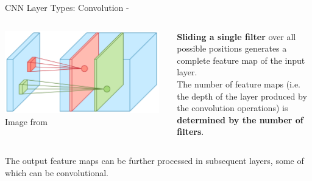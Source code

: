 \begin{frame}[t,allowframebreaks]{CNN Layer Types: Convolution -}
    \begin{columns}
        \begin{column}{0.60\textwidth}
            \begin{center}
                \includegraphics[width=0.97\textwidth]
                  {./images/cnn/convolution/dertat17_convolution_illustration.png}\\
                {\scriptsize 
                  \color{col:attribution} 
                  Image from \cite{TowardsDataScience:AppliedDL4}}\\    
            \end{center}      
        \end{column}
        \begin{column}{0.40\textwidth}
            {\bf Sliding a single filter} over all possible positions generates
            a complete \gls{feature map} of the input layer.\\
            \vspace{0.2cm}
            The number of \glspl{feature map} (i.e. the depth of the layer
            produced by the convolution operations)
            is {\bf determined by the number of filters}.\\
        \end{column}
    \end{columns}
    \vspace{0.2cm}
    The output \glspl{feature map} can be further processed in subsequent layers,
    some of which can be convolutional.

    \framebreak


\end{frame}
